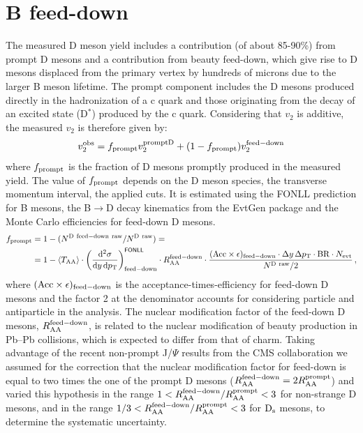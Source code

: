 \section{B feed-down}
\label{feeddownsec}
The measured D meson yield includes a contribution (of about 85-90\%)
from prompt D mesons and a contribution from beauty feed-down, which give rise
to D mesons displaced from the primary vertex by hundreds of microns
due to the larger B meson lifetime.
The prompt component includes the D mesons produced directly in the 
hadronization of a c quark and those originating from the decay of an
excited state (D$^*$) produced by the c quark.
Considering that $v_2$ is additive, the measured $v_2$ is therefore given by:
\begin{equation}
\label{eq:bfeed}
v_2^{\rm obs}=f_{\rm prompt} v_2^{\rm promptD} + (1-f_{\rm prompt})v_2^{\rm feed-down}
\end{equation}
where $f_{\rm prompt}$ is the fraction of D mesons promptly produced in the measured
yield.
The value of $f_{\rm prompt}$ depends on the D meson species, the transverse
momentum interval, the applied cuts.
It is estimated using the FONLL prediction for B mesons, 
the B$\rightarrow$D decay kinematics from the EvtGen package and
the Monte Carlo efficiencies for feed-down D mesons. 
\begin{equation}
 \label{eq:fpNbMethod}
 \begin{split}
   f_{\rm prompt} &= 1-(N^{\rm D~feed-down~raw}/N^{\rm D~raw})=\\
   &= 1 - \langle T_{\rm AA} \rangle 
   \cdot \left( \frac{{\rm d}^2 \sigma}{{\rm d}y \, {\rm d}p_{\rm T} }
\right)^{{\sf FONLL}} _{{\rm feed-down}} \cdot R_{\rm AA}^{\rm feed-down} \cdot
\frac{({\rm Acc}\times\epsilon)_{\rm feed-down}\cdot\Delta y \, \Delta p_{\rm T}
\cdot {\rm BR} \cdot N_{\rm evt}  }{ N^{\rm D~raw }  / 2} \, ,
 \end{split}
\end{equation}
where $({\rm Acc}\times\epsilon)_{{\rm feed-down}}$ is the 
acceptance-times-efficiency for feed-down D mesons and the factor 2 at the denominator
accounts for considering particle and antiparticle in the analysis.
The nuclear modification factor of the feed-down D mesons, $R_{\rm AA}^{\rm feed-down}$,
is related to the nuclear modification of beauty production in Pb--Pb 
collisions, which is expected to differ from that of charm. 
 Taking advantage of the
recent non-prompt J/$\Psi$ results from the CMS collaboration we
assumed for the correction that the nuclear modification factor 
for feed-down is equal to two times the one of the prompt D mesons ($R_{\rm AA}^{\rm feed-down}=2R_{\rm AA}^{\rm prompt}$) and varied this hypothesis
in the range $1<R_{\rm AA}^{\rm feed-down}/R_{\rm AA}^{\rm prompt}<3$ for non-strange D mesons, and in the range  
$1/3<R_{\rm AA}^{\rm feed-down}/R_{\rm AA}^{\rm prompt}<3$ for ${\rm D_s}$ mesons,
to determine the systematic uncertainty.

